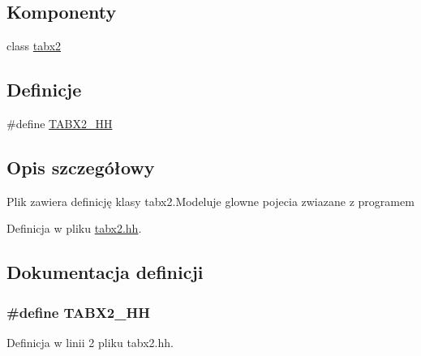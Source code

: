 \subsection*{Komponenty}
\begin{DoxyCompactItemize}
\item 
class \hyperlink{classtabx2}{tabx2}
\end{DoxyCompactItemize}
\subsection*{Definicje}
\begin{DoxyCompactItemize}
\item 
\#define \hyperlink{tabx2_8hh_ab76bf9329c796034d3ea1300008f135e}{T\-A\-B\-X2\-\_\-\-H\-H}
\end{DoxyCompactItemize}


\subsection{Opis szczegółowy}
Plik zawiera definicję klasy tabx2.\-Modeluje glowne pojecia zwiazane z programem 

Definicja w pliku \hyperlink{tabx2_8hh_source}{tabx2.\-hh}.



\subsection{Dokumentacja definicji}
\hypertarget{tabx2_8hh_ab76bf9329c796034d3ea1300008f135e}{
\subsubsection[{T\-A\-B\-X2\-\_\-\-H\-H}]{\setlength{\rightskip}{0pt plus 5cm}\#define T\-A\-B\-X2\-\_\-\-H\-H}}\label{tabx2_8hh_ab76bf9329c796034d3ea1300008f135e}


Definicja w linii 2 pliku tabx2.\-hh.

